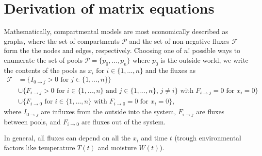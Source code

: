 \section{Derivation of matrix equations}
\label{appendix:MatrixDerivation}
Mathematically, compartmental models are most economically described as graphs, where the set of compartments $\mathcal{P}$ and the set of non-negative fluxes $\mathcal{F}$ form the the nodes and edges, respectively. 
Choosing one of $n!$ possible ways to enumerate  the set of pools $\mathcal{P}=\{p_0,\dots,p_n\}$ where $p_0$ is the outside world, we write the contents of the pools as $x_i \text{ for } i \in \{1,\dots,n\} $ and the fluxes as
\begin{align*}
\mathcal{F} &=
\{
I_{0 \rightarrow j} > 0
\text{ for } j \in \{1,\dots ,n\}
\}  
\\
&
\cup
\{
F_{i \rightarrow j} > 0
\text{ for } i \in \{1,\dots ,n\} 
\text{ and } j \in \{1,\dots ,n\},\, j\ne i
\}
\text{ with }
F_{i \rightarrow j}=0 \text{ for }  x_{i} = 0 
\}
\\
&
\cup
\{
F_{i \rightarrow 0} 
\text{ for } i \in \{1,\dots ,n\} 
\text{ with }
F_{i \rightarrow 0}=0 \text{ for }  x_{i} = 0 
\},
\end{align*}
\label{massbalance} 
where 
$ 
I_{0 \rightarrow j} 
$
are influxes from the outside into the system, 
$
F_{i \rightarrow j} 
$
are fluxes between pools, 
and 
$
F_{i \rightarrow 0} 
$
are fluxes out of the system.

In general, all fluxes can depend on all the $x_i$  and time $t$ (trough environmental factors like temperature $T(t)$ and moisture $W(t)$).

